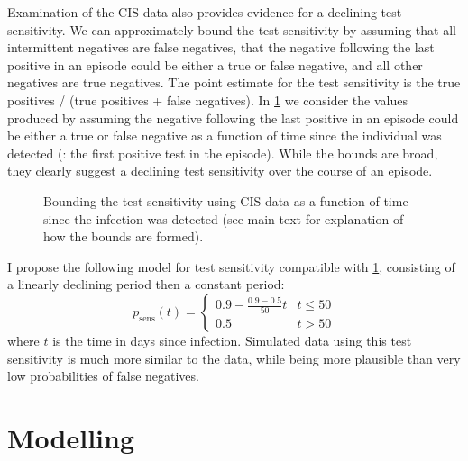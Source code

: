 \documentclass[thesis.tex]{subfiles}
\begin{document}
Examination of the CIS data also provides evidence for a declining test sensitivity.
We can approximately bound the test sensitivity by assuming that all intermittent negatives are false negatives, that the negative following the last positive in an episode could be either a true or false negative, and all other negatives are true negatives.
The point estimate for the test sensitivity is the true positives / (true positives + false negatives).
In \cref{imperf-test:fig:bounding-cis-sensitivity} we consider the values produced by assuming the negative following the last positive in an episode could be either a true or false negative as a function of time since the individual was detected (\ie: the first positive test in the episode).
While the bounds are broad, they clearly suggest a declining test sensitivity over the course of an episode.
\begin{figure}
  \caption[Bounding test sensitivity using CIS data]{Bounding the test sensitivity using CIS data as a function of time since the infection was detected (see main text for explanation of how the bounds are formed).\label{imperf-test:fig:bounding-cis-sensitivity}}
\end{figure}

I propose the following model for test sensitivity compatible with \cref{imperf-test:fig:bounding-cis-sensitivity}, consisting of a linearly declining period then a constant period:
\begin{equation}
  p_\text{sens}(t) = \begin{cases}
    0.9 - \frac{0.9-0.5}{50}t &t \leq 50 \\
    0.5 &t > 50
  \end{cases}
\end{equation}
where $t$ is the time in days since infection.
Simulated data using this test sensitivity is much more similar to the data, while being more plausible than very low probabilities of false negatives.


\section{Modelling} \label{imperf-test:sec:modelling}
\end{document}
